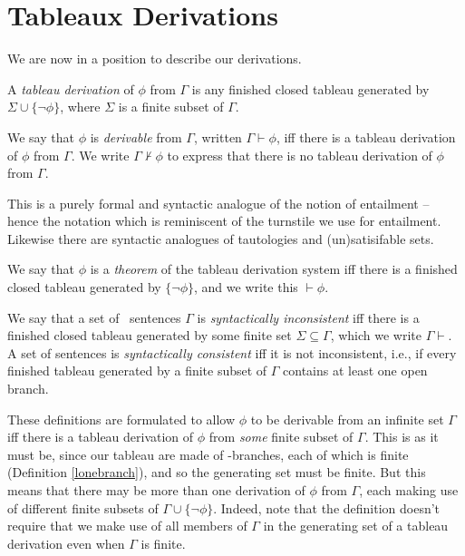 \section{Tableaux Derivations}



We are now in a position to describe our derivations. \begin{definition}\label{tablderv}
	A \emph{tableau derivation} of $\phi$ from $\Gamma$ is any finished closed tableau generated by $\Sigma \cup \{¬\phi\}$, where $\Sigma$ is a finite subset of $\Gamma$. 

	We say that $\phi$ is \emph{derivable} from $\Gamma$, written $\Gamma \vdash \phi$, iff there is a tableau derivation of $\phi$ from $\Gamma$. We write $\Gamma \nvdash \phi$ to express that there is no tableau derivation of $\phi$ from $\Gamma$.
\end{definition}
 This is a purely formal and syntactic analogue of the notion of entailment – hence the notation which is reminiscent of the turnstile we use for entailment. 
Likewise there are syntactic analogues of tautologies and (un)satisifable sets. \begin{definition}[Theoremhood]
	We say that $\phi$ is a \emph{theorem} of the tableau derivation system iff there is a finished closed tableau generated by $\{¬\phi\}$, and we write this $\vdash \phi$.
\end{definition}

\begin{definition}\label{defcontab}
	We say that a set of \lone\ sentences $\Gamma$ is \emph{syntactically inconsistent} iff there is a finished closed tableau generated by some finite set $\Sigma \subseteq \Gamma$, which we write $\Gamma \vdash$. A set of sentences is \emph{syntactically consistent} iff it is not inconsistent, i.e., if every finished tableau generated by a finite subset of $\Gamma$ contains at least one open branch.
\end{definition}

These definitions are formulated to allow $\phi$ to be derivable from an infinite set $\Gamma$ iff there is a tableau derivation of $\phi$ from \emph{some} finite subset of $\Gamma$. This is as it must be, since our tableau are made of \lone-branches, each of which is finite (Definition \ref{lonebranch}), and so the generating set must be finite. But this means that there may be more than one derivation of $\phi$ from $\Gamma$, each making use of different finite subsets of $\Gamma\cup\{¬\phi\}$. Indeed, note that the definition doesn't require that we make use of all members of $\Gamma$ in the generating set of a tableau derivation even when $\Gamma$ is finite.

